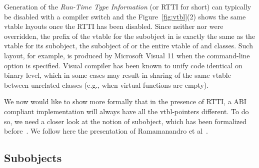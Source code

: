 Generation of the \emph{Run-Time Type Information} (or RTTI for short) can 
typically be disabled with a compiler switch and the Figure~\ref{fig:vtbl}(2) 
shows the same vtable layouts once the RTTI has been disabled. Since neither 
 nor  were overridden, the prefix of the vtable for the 
 subobject in  is exactly the same as the vtable for its 
 subobject, the  subobject of  or the entire vtable of 
 and  classes. Such layout, for example, is produced by 
Microsoft Visual \Cpp{} 11 when the command-line option  is specified. 
Visual \Cpp{} compiler has been known to unify code identical on binary level, 
which in some cases may result in sharing of the same vtable between unrelated 
classes (e.g., when virtual functions are empty).


We now would like to show more formally that in the presence of RTTI, a \Cpp{} ABI 
compliant implementation will always have all the vtbl-pointers different. To do 
so, we need a closer look at the notion of subobject, which has been formalized 
before~\cite{RF95,WNST06,RDL11}. We follow here the presentation of Ramamanandro 
et al~\cite{RDL11}.

\subsection{Subobjects}
\label{sec:subobj}

